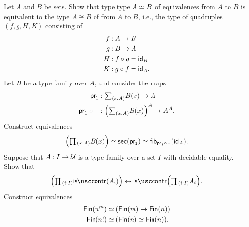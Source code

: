 \begin{exercises}
\exercise \label{ex:iso_equiv}Let $A$ and $B$ be sets. Show that type type $\eqv{A}{B}$ of equivalences from $A$ to $B$ is equivalent to the type $A\cong B$ of  from $A$ to $B$, i.e., the type of quadruples $(f,g,H,K)$ consisting of
\begin{align*}
f & : A\to B \\
g & : B\to A \\
H & : f\circ g = \idfunc[B] \\
K & : g\circ f = \idfunc[A].
\end{align*}
\exercise \label{ex:pi_sec}Let $B$ be a type family over $A$, and consider the maps
  \begin{align*}
    \proj 1 & : \sm{x:A} B(x)\to A \\
    \proj1 \circ \blank & : \Big(\sm{x:A} B(x)\Big)^A \to A^A.
  \end{align*}
  Construct equivalences
  \begin{equation*}
    \Big(\prd{x:A}B(x)\Big) \eqvsym \sections(\proj 1) \eqvsym \fib{\proj 1 \circ\blank}{\idfunc[A]}.
  \end{equation*}
\exercise Suppose that $A:I\to \UU$ is a type family over a set $I$ with decidable equality. Show that
  \begin{equation*}
    \Big(\prd{i:I}\iscontr(A_i)\Big)\leftrightarrow \iscontr\Big(\prd{i:I}A_i\Big).
  \end{equation*}
\exercise Construct equivalences
  \begin{align*}
    \Fin(n^m) & \simeq (\Fin(m)\to\Fin(n)) \\
    \Fin(n!) & \simeq (\Fin(n)\simeq\Fin(n)).
  \end{align*}
\end{exercises}
